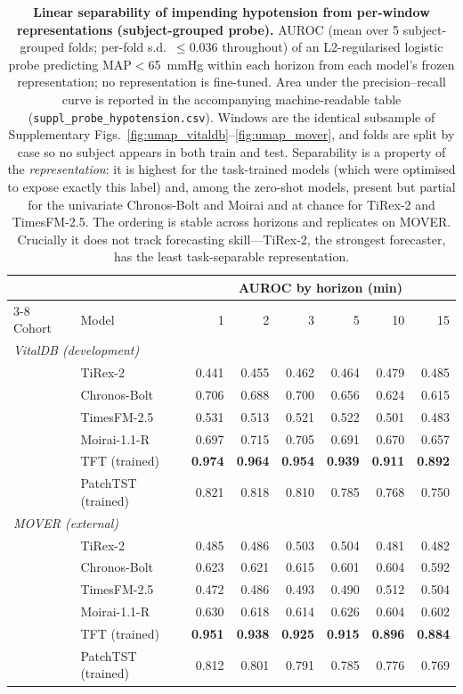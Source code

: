 \begin{table}[ht]
\centering\footnotesize
\caption{\textbf{Linear separability of impending hypotension from per-window representations (subject-grouped probe).} AUROC (mean over 5 subject-grouped folds; per-fold s.d.\ $\leq$0.036 throughout) of an L2-regularised logistic probe predicting MAP$<$65~mmHg within each horizon from each model's frozen representation; no representation is fine-tuned. Area under the precision--recall curve is reported in the accompanying machine-readable table (\texttt{suppl\_probe\_hypotension.csv}). Windows are the identical subsample of Supplementary Figs.~\ref{fig:umap_vitaldb}--\ref{fig:umap_mover}, and folds are split by case so no subject appears in both train and test. Separability is a property of the \emph{representation}: it is highest for the task-trained models (which were optimised to expose exactly this label) and, among the zero-shot models, present but partial for the univariate Chronos-Bolt and Moirai and at chance for TiRex-2 and TimesFM-2.5. The ordering is stable across horizons and replicates on MOVER. Crucially it does not track forecasting skill---TiRex-2, the strongest forecaster, has the least task-separable representation.}
\label{tab:probe_hypo}
\begin{tabular}{llrrrrrr}
\toprule
& & \multicolumn{6}{c}{AUROC by horizon (min)} \\
\cmidrule(lr){3-8}
Cohort & Model & 1 & 2 & 3 & 5 & 10 & 15 \\
\midrule
\multicolumn{8}{l}{\textit{VitalDB (development)}}\\
& TiRex-2 & 0.441 & 0.455 & 0.462 & 0.464 & 0.479 & 0.485 \\
& Chronos-Bolt & 0.706 & 0.688 & 0.700 & 0.656 & 0.624 & 0.615 \\
& TimesFM-2.5 & 0.531 & 0.513 & 0.521 & 0.522 & 0.501 & 0.483 \\
& Moirai-1.1-R & 0.697 & 0.715 & 0.705 & 0.691 & 0.670 & 0.657 \\
& TFT (trained) & \textbf{0.974} & \textbf{0.964} & \textbf{0.954} & \textbf{0.939} & \textbf{0.911} & \textbf{0.892} \\
& PatchTST (trained) & 0.821 & 0.818 & 0.810 & 0.785 & 0.768 & 0.750 \\
\midrule
\multicolumn{8}{l}{\textit{MOVER (external)}}\\
& TiRex-2 & 0.485 & 0.486 & 0.503 & 0.504 & 0.481 & 0.482 \\
& Chronos-Bolt & 0.623 & 0.621 & 0.615 & 0.601 & 0.604 & 0.592 \\
& TimesFM-2.5 & 0.472 & 0.486 & 0.493 & 0.490 & 0.512 & 0.504 \\
& Moirai-1.1-R & 0.630 & 0.618 & 0.614 & 0.626 & 0.604 & 0.602 \\
& TFT (trained) & \textbf{0.951} & \textbf{0.938} & \textbf{0.925} & \textbf{0.915} & \textbf{0.896} & \textbf{0.884} \\
& PatchTST (trained) & 0.812 & 0.801 & 0.791 & 0.785 & 0.776 & 0.769 \\
\bottomrule
\end{tabular}
\end{table}

